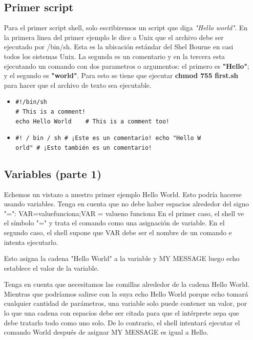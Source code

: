 \documentclass[12pt,letterpaper]{article}
\begin{document}
{        \subsection{Primer script}
        Para el primer script shell, solo escribiremos un script que diga \emph{"Hello world"}. En la primera linea del primer ejemplo le dice a Unix que el archivo debe ser ejecutado por /bin/sh. Esta es la ubicación estándar del Shel Bourne en casi todos los sistemas Unix. La segunda es un comentario y en la tercera esta ejecutando un comando con dos parametros o argumentos: el primero es \textbf{"Hello"}; y el segundo es \textbf{"world"}. Para esto se tiene que ejecutar \textbf{chmod 755 first.sh} para hacer que el archivo de texto sea ejecutable.
        \begin{itemize}
        \color{red} 
        \item \begin{verbatim}
#!/bin/sh
# This is a comment!
echo Hello World	# This is a comment too!
        \end{verbatim}
        \item
        \begin{verbatim}
#! / bin / sh # ¡Este es un comentario! echo "Hello W
orld" # ¡Esto también es un comentario!
        \end{verbatim}
        \end{itemize}
        
        \color{black}
        \subsection{Variables (parte 1)}
        Echemos un vistazo a nuestro primer ejemplo Hello World. Esto podría hacerse usando variables.
Tenga en cuenta que no debe haber espacios alrededor del signo "=": VAR=valuefunciona;VAR = valueno funciona En el primer caso, el shell ve el símbolo "=" y trata el comando como una asignación de variable. En el segundo caso, el shell supone que VAR debe ser el nombre de un comando e intenta ejecutarlo.\par
Esto asigna la cadena "Hello World" a la variable y MY MESSAGE luego echo establece el valor de la variable.\par
Tenga en cuenta que necesitamos las comillas alrededor de la cadena Hello World. Mientras que podríamos salirse con la suya echo Hello World porque echo tomará cualquier cantidad de parámetros, una variable solo puede contener un valor, por lo que una cadena con espacios debe ser citada para que el intérprete sepa que debe tratarlo todo como uno solo. De lo contrario, el shell intentará ejecutar el comando World después de asignar MY MESSAGE es igual a Hello.  

}
\end{document}
